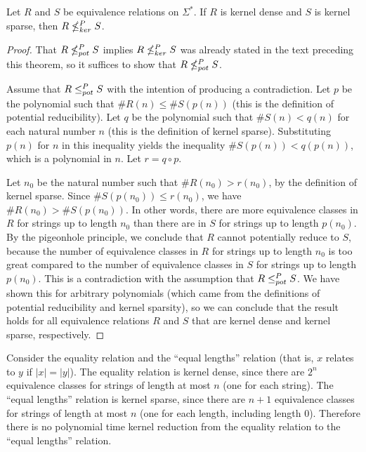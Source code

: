 \begin{theorem}\label{thm:density}
  Let $R$ and $S$ be equivalence relations on $\Sigma^*$.
  If $R$ is kernel dense and $S$ is kernel sparse, then $R\nleq^{P}_{ker} S$.
\end{theorem}
\begin{proof}
  That $R\nleq^{P}_{pot} S$ implies $R\nleq^{P}_{ker} S$ was already stated in the text preceding this theorem, so it suffices to show that $R\nleq^{P}_{pot} S$.

  Assume that $R\leq^{P}_{pot} S$ with the intention of producing a contradiction.
  Let $p$ be the polynomial such that $\#R(n) \leq \#S(p(n))$ (this is the definition of potential reducibility).
  Let $q$ be the polynomial such that $\#S(n) < q(n)$ for each natural number $n$ (this is the definition of kernel sparse).
  Substituting $p(n)$ for $n$ in this inequality yields the inequality $\#S(p(n)) < q(p(n))$, which is a polynomial in $n$.
  Let $r = q \circ p$.

  Let $n_0$ be the natural number such that $\#R(n_0) > r(n_0)$, by the definition of kernel sparse.
  Since $\#S(p(n_0)) \leq r(n_0)$, we have $\#R(n_0) > \#S(p(n_0))$.
  In other words, there are more equivalence classes in $R$ for strings up to length $n_0$ than there are in $S$ for strings up to length $p(n_0)$.
  By the pigeonhole principle, we conclude that $R$ cannot potentially reduce to $S$, because the number of equivalence classes in $R$ for strings up to length $n_0$ is too great compared to the number of equivalence classes in $S$ for strings up to length $p(n_0)$.
  This is a contradiction with the assumption that $R\leq^{P}_{pot} S$.
  We have shown this for arbitrary polynomials (which came from the definitions of potential reducibility and kernel sparsity), so we can conclude that the result holds for all equivalence relations $R$ and $S$ that are kernel dense and kernel sparse, respectively.
\end{proof}

\begin{example}
  Consider the equality relation and the ``equal lengths'' relation (that is, $x$ relates to $y$ if $|x| = |y|$).
  The equality relation is kernel dense, since there are $2^n$ equivalence classes for strings of length at most $n$ (one for each string).
  The ``equal lengths'' relation is kernel sparse, since there are $n + 1$ equivalence classes for strings of length at most $n$ (one for each length, including length $0$).
  Therefore there is no polynomial time kernel reduction from the equality relation to the ``equal lengths'' relation.
\end{example}

